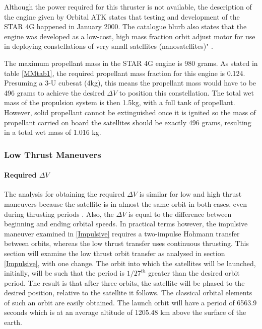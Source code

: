 Although the power required for this thruster is not available, the description of the engine given by Orbital ATK states that testing and development of the STAR 4G happened in January 2000. The catalogue blurb also states that the engine was developed as a low-cost, high mass fraction orbit adjust motor for use in deploying constellations of very small satellites (nanosatellites)" \cite{STAR4G}.

The maximum propellant mass in the STAR 4G engine is 980 grams. As stated in table \ref{MMtab1}, the required propellant mass fraction for this engine is 0.124. Presuming a 3-U cubesat (4kg), this means the propellant mass would have to be 496 grams to achieve the desired $\Delta V$ to position this constellation. The total wet mass of the propulsion system is then 1.5kg, with a full tank of propellant. However, solid propellant cannot be extinguished once it is ignited so the mass of propellant carried on board the satellites should be exactly 496 grams, resulting in a total wet mass of 1.016 kg.

\subsubsection{Low Thrust Maneuvers}
\paragraph{Required $\Delta V$}
The analysis for obtaining the required $\Delta V$ is similar for low and high thrust maneuvers because the satellite is in almost the same orbit in both cases, even during thrusting periods \cite{MIT}. Also, the $\Delta V$ is equal to the difference between beginning and ending orbital speeds. In practical terms however, the impulsive maneuver examined in \ref{Impulsive} requires a two-impulse Hohmann transfer between orbits, whereas the low thrust transfer uses continuous thrusting. This section will examine the low thrust orbit transfer as analysed in section \ref{Impulsive}, with one change. The orbit into which the satellites will be launched, initially, will be such that the period is  $1/27^{th}$ greater than the desired orbit period. The result is that after three orbits, the satellite will be phased to the desired position, relative to the satellite it follows. The classical orbital elements of such an orbit are easily obtained. The launch orbit will have a period of 6563.9 seconds which is at an average altitude of 1205.48 km above the surface of the earth.


